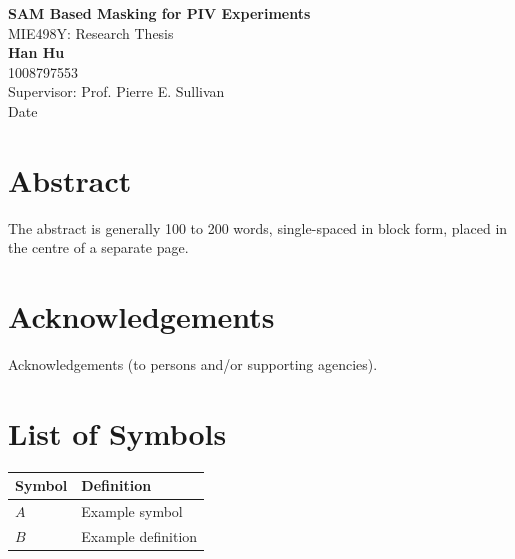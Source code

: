 \documentclass[12pt]{report}
\begin{document}
\begin{titlepage}
\centering
\vspace*{1in}

{\Large \textbf{SAM Based Masking for PIV Experiments}}\\[1.5in]

{\large MIE498Y: Research Thesis}\\[0.5in]

\textbf{Han Hu}\\
1008797553\\[1in]

Supervisor: Prof. Pierre E. Sullivan\\[1in]

Date

\vfill
\end{titlepage}


\chapter*{Abstract}
The abstract is generally 100 to 200 words, single-spaced in block form, placed in the centre of a separate page.

\newpage

\chapter*{Acknowledgements}
Acknowledgements (to persons and/or supporting agencies).

\newpage

\tableofcontents
\newpage

\chapter*{List of Symbols}

\begin{tabular}{ll}
Symbol & Definition \\
\hline
$A$ & Example symbol \\
$B$ & Example definition \\
\end{tabular}
\end{document}
